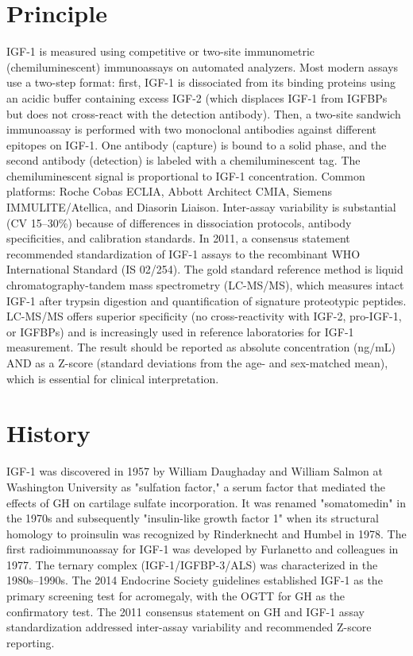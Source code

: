 \section*{Principle}
IGF-1 is measured using competitive or two-site immunometric (chemiluminescent) immunoassays on automated analyzers. Most modern assays use a two-step format: first, IGF-1 is dissociated from its binding proteins using an acidic buffer containing excess IGF-2 (which displaces IGF-1 from IGFBPs but does not cross-react with the detection antibody). Then, a two-site sandwich immunoassay is performed with two monoclonal antibodies against different epitopes on IGF-1. One antibody (capture) is bound to a solid phase, and the second antibody (detection) is labeled with a chemiluminescent tag. The chemiluminescent signal is proportional to IGF-1 concentration. Common platforms: Roche Cobas ECLIA, Abbott Architect CMIA, Siemens IMMULITE/Atellica, and Diasorin Liaison. Inter-assay variability is substantial (CV 15--30\%) because of differences in dissociation protocols, antibody specificities, and calibration standards. In 2011, a consensus statement recommended standardization of IGF-1 assays to the recombinant WHO International Standard (IS 02/254). The gold standard reference method is liquid chromatography-tandem mass spectrometry (LC-MS/MS), which measures intact IGF-1 after trypsin digestion and quantification of signature proteotypic peptides. LC-MS/MS offers superior specificity (no cross-reactivity with IGF-2, pro-IGF-1, or IGFBPs) and is increasingly used in reference laboratories for IGF-1 measurement. The result should be reported as absolute concentration (ng/mL) AND as a Z-score (standard deviations from the age- and sex-matched mean), which is essential for clinical interpretation.

\section*{History}
IGF-1 was discovered in 1957 by William Daughaday and William Salmon at Washington University as "sulfation factor," a serum factor that mediated the effects of GH on cartilage sulfate incorporation. It was renamed "somatomedin" in the 1970s and subsequently "insulin-like growth factor 1" when its structural homology to proinsulin was recognized by Rinderknecht and Humbel in 1978. The first radioimmunoassay for IGF-1 was developed by Furlanetto and colleagues in 1977. The ternary complex (IGF-1/IGFBP-3/ALS) was characterized in the 1980s--1990s. The 2014 Endocrine Society guidelines established IGF-1 as the primary screening test for acromegaly, with the OGTT for GH as the confirmatory test. The 2011 consensus statement on GH and IGF-1 assay standardization addressed inter-assay variability and recommended Z-score reporting.

